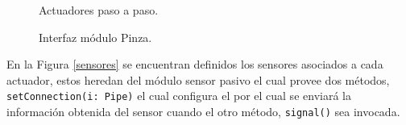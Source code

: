 \begin{figure}[H]
    \begin{minipage}[c]{0.48\textwidth}
        \centering
        \caption{Actuadores paso a paso.}
        \label{estructuraActuadores}
    \end{minipage}
    \hfill %
    \begin{minipage}[c]{0.48\textwidth}
        \centering
        \caption{Interfaz módulo Pinza.}
        \label{moduloPinza}
    \end{minipage}
\end{figure}

En la Figura \ref{sensores} se encuentran definidos los sensores asociados a cada actuador, estos heredan del módulo sensor pasivo el cual provee dos métodos, \verb|setConnection(i: Pipe)| el cual configura el \Pipe por el cual se enviará la información obtenida del sensor cuando el otro método, \verb|signal()| sea invocada.

